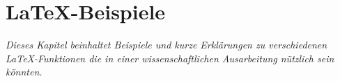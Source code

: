 
\chapter{\LaTeX-Beispiele}
\label{sec:anhang:latex-beispiele}
	\emph{Dieses Kapitel beinhaltet Beispiele und kurze Erklärungen zu verschiedenen \LaTeX-Funktionen die in einer wissenschaftlichen Ausarbeitung nützlich sein könnten.%
	 }
		

